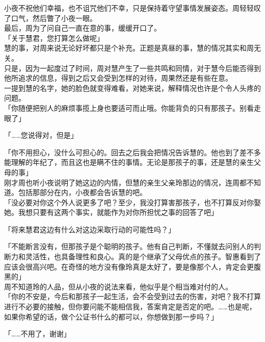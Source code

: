 小夜不祝他们幸福，也不诅咒他们不幸，只是保持着守望事情发展姿态。周轻轻叹了口气，然后瞥了小夜一眼。\\

最后，周为了问自己一直在意的事，缓缓开口了。\\

「关于慧君，您打算怎么做呢」\\

慧的事，对周来说无论好坏都只是个补充。正题是真昼的事，慧的情况其实和周无关。\\

只是，因为一起度过了时间，周对慧产生了一些共鸣和同情，对于慧今后能否得到他所追求的信息，得到之后又会受到怎样的对待，周果然还是有些在意。\\

一提到慧的名字，她的脸色就变得难看，对她来说，解释情况也许是个令人头疼的问题。\\

「你随便把别人的麻烦事揽上身也要适可而止哦。你能背负的只有那孩子。别看走眼了」

「……您说得对，但是」

「你不用担心，没什么可担心的。回去之后我会把情况告诉慧的。他也到了差不多能理解的年纪了，而且这也是瞒不住的事情。无论是那孩子的事，还是慧的亲生父母的事」\\

刚才周也听小夜说明了她这边的内情，但慧的亲生父亲玲那边的情况，连周都不知道。包括那部分在内，小夜都会告诉慧的吧。\\

「没必要对你这个外人说更多了吧？至少，我没打算害那孩子，也不打算反对你娶她。我想只要有这两个事实，就能作为对你所担忧之事的回答了吧」

「将来慧君这边有什么对这边采取行动的可能性吗？」

「不能断言没有，但那孩子是个聪明的孩子。他有自己判断，不懂就去问别人的判断力和灵活性，也具备理性和良心。真的是个继承了父母优点的孩子。智惠看到了应该会很高兴吧。在奇怪的地方没有像玲真是太好了，要是像那个人，肯定会更腹黑的」\\

周不知道玲的人品，但从小夜的说法来看，他似乎是个相当难对付的人。\\

「你的不安是，今后和那孩子一起生活，会不会受到过去的伤害，对吧？我不打算进行不必要的接触，但你要问能不能相信我，答案肯定是否定的吧。……也是呢，如果你希望的话，做个公证书什么的都可以，你想做到那一步吗？」

「……不用了，谢谢」


